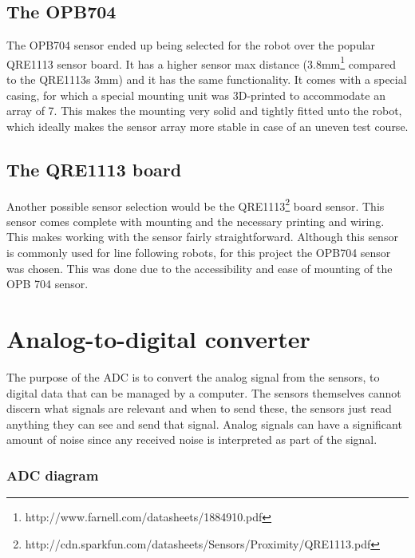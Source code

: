 \subsection{The OPB704}
The OPB704 sensor ended up being selected for the robot over the popular QRE1113 sensor board. It has a higher sensor max distance (3.8mm\footnote{http://www.farnell.com/datasheets/1884910.pdf} compared to the QRE1113s 3mm) and it has the same functionality. It comes with a special casing, for which a special mounting unit was 3D-printed to accommodate an array of 7. This makes the mounting very solid and tightly fitted unto the robot, which ideally makes the sensor array more stable in case of an uneven test course.

\subsection{The QRE1113 board}
Another possible sensor selection would be the QRE1113\footnote{http://cdn.sparkfun.com/datasheets/Sensors/Proximity/QRE1113.pdf} board sensor. This sensor comes complete with mounting and the necessary printing and wiring. This makes working with the sensor fairly straightforward. Although this sensor is commonly used for line following robots, for this project the OPB704 sensor was chosen. This was done due to the accessibility and ease of mounting of the OPB 704 sensor.


\section{Analog-to-digital converter}
The purpose of the ADC is to convert the analog signal from the sensors, to digital data that can be managed by a computer. The sensors themselves cannot discern what signals are relevant and when to send these, the sensors just read anything they can see and send that signal. Analog signals can have a significant amount of noise since any received noise is interpreted as part of the signal.

\subsubsection{ADC diagram} 
\newpage
